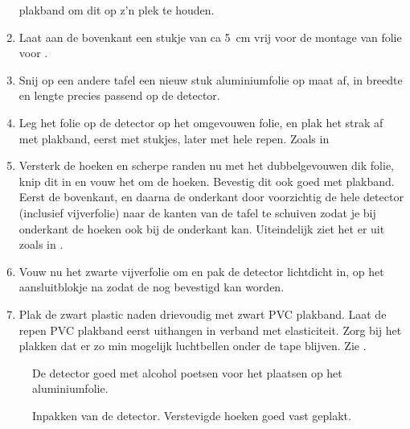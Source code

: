 \begin{enumerate}
    plakband om dit op z'n plek te houden. 
    \item Laat aan de bovenkant een stukje van ca \SI{5}{\centi\meter}
    vrij voor de montage van folie voor \pmt.
    \item Snij op een andere tafel een nieuw stuk aluminiumfolie op maat
    af, in breedte en lengte precies passend op de detector.
    \item Leg het folie op de detector op het omgevouwen folie, en plak
    het strak af met plakband, eerst met stukjes, later met hele repen.
    Zoals in 
    \item Versterk de hoeken en scherpe randen nu met het dubbelgevouwen
    dik folie, knip dit in en vouw het om de hoeken. Bevestig dit ook
    goed met plakband. Eerst de bovenkant, en daarna de onderkant door
    voorzichtig de hele detector (inclusief vijverfolie) naar de kanten
    van de tafel te schuiven zodat je bij onderkant de hoeken ook bij de
    onderkant kan. Uiteindelijk ziet het er uit zoals in
    .
    \item Vouw nu het zwarte vijverfolie om en pak de detector lichtdicht
    in, op het aansluitblokje na zodat de \pmt nog bevestigd kan worden.
    \item Plak de zwart plastic naden drievoudig met zwart PVC plakband.
    Laat de repen PVC plakband eerst uithangen in verband met
    elasticiteit. Zorg bij het plakken dat er zo min mogelijk
    luchtbellen onder de tape blijven. Zie .
\end{enumerate}

\begin{figure}
    \centering
    \caption{De detector goed met alcohol poetsen voor het plaatsen op
             het aluminiumfolie.}
\end{figure}

\begin{figure}
    \centering
    \caption{Inpakken van de detector. Verstevigde hoeken goed vast geplakt.}
\end{figure}

